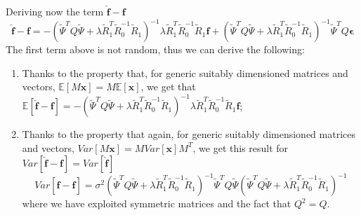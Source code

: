 Deriving now the term $\hat{\bm{f}} - \bm{f}$
\begin{equation}
    \hat{\bm{f}} - \bm{f} =
    -\left(\tilde{\Psi}^TQ\tilde{\Psi} +\lambda \tilde{R}_1^T \tilde{R}_0^{-1} \tilde{R}_1 \right)^{-1}
    \lambda \tilde{R}_1^T \tilde{R}_0^{-1} \tilde{R}_1 \bm{f} +
    \left(\tilde{\Psi}^TQ\tilde{\Psi} +\lambda \tilde{R}_1^T \tilde{R}_0^{-1} \tilde{R}_1 \right)^{-1} 
    \tilde{\Psi}^T Q \bm{\epsilon}
\end{equation}
The first term above is not random, thus we can derive the following: \begin{enumerate}[wide, labelindent=0pt]
    \item Thanks to the property that, for generic suitably dimensioned matrices and vectors, $\mathbb{E}\left[M \bm{x}\right] = M \mathbb{E}\left[\bm{x}\right]$, we get that $\mathbb{E}\left[\hat{\bm{f}} - \bm{f}\right] = 
    -\left(\tilde{\Psi}^TQ\tilde{\Psi} +\lambda \tilde{R}_1^T \tilde{R}_0^{-1} \tilde{R}_1 \right)^{-1}
    \lambda \tilde{R}_1^T \tilde{R}_0^{-1} \tilde{R}_1 \bm{f}$;
    \item Thanks to the property that again, for generic suitably dimensioned matrices and vectors, $Var  \left[M \bm{x}\right] = M Var\left[\bm{x}\right] M^T$, we get this result for $Var\left[\hat{\bm{f}} - \bm{f}\right] = Var \left[\hat{\bm{f}}\right]$
    \begin{equation}
        Var\left[\hat{\bm{f}} - \bm{f}\right] =
        \sigma^2 \left(\tilde{\Psi}^TQ\tilde{\Psi} +\lambda \tilde{R}_1^T \tilde{R}_0^{-1} \tilde{R}_1 \right)^{-1} \tilde{\Psi}^T Q
        \tilde{\Psi} \left(\tilde{\Psi}^TQ\tilde{\Psi} +\lambda \tilde{R}_1^T \tilde{R}_0^{-1} \tilde{R}_1 \right)^{-1}
    \end{equation}
    where we have exploited symmetric matrices and the fact that $Q^2 = Q$.
\end{enumerate}
